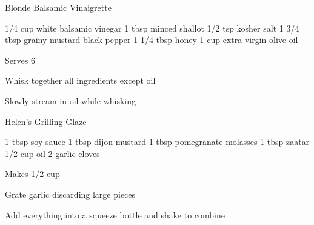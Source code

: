 \begin{recipe}{Blonde Balsamic Vinaigrette}{}
\begin{ingredients}
1/4 cup white balsamic vinegar
1 tbsp minced shallot
1/2 tsp kosher salt
1 3/4 tbsp grainy mustard
black pepper
1 1/4 tbsp honey
1 cup extra virgin olive oil
\end{ingredients}
\nextcolumn
Serves 6
\begin{steps}
\item Whisk together all ingredients except oil
\item Slowly stream in oil while whisking
\end{steps}
\end{recipe}

\begin{recipe}{Helen's Grilling Glaze}{}
\begin{ingredients}
1 tbsp soy sauce
1 tbsp dijon mustard
1 tbsp pomegranate molasses
1 tbsp zaatar
1/2 cup oil
2 garlic cloves
\end{ingredients}
\nextcolumn
Makes 1/2 cup
\begin{steps}
    \item Grate garlic discarding large pieces
    \item Add everything into a squeeze bottle and shake to combine
\end{steps}
\end{recipe}